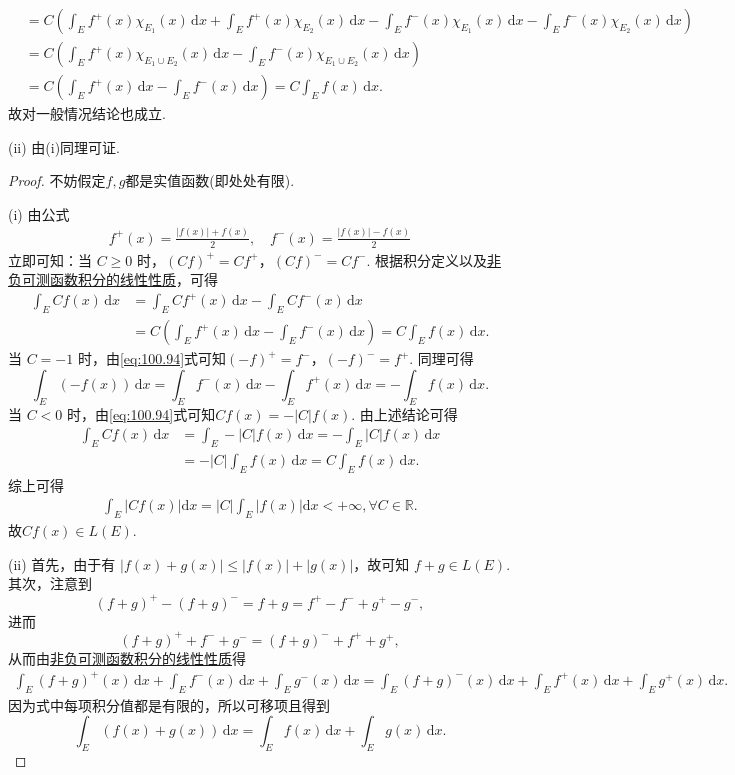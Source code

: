\documentclass[../../main.tex]{subfiles}
\begin{document}
\begin{remark}
\begin{align*}
&= C \left( \int_E f^+(x) \chi_{E_1}(x) \, \mathrm{d}x + \int_E f^+(x) \chi_{E_2}(x) \, \mathrm{d}x - \int_E f^-(x) \chi_{E_1}(x) \, \mathrm{d}x - \int_E f^-(x) \chi_{E_2}(x) \, \mathrm{d}x \right) \\
&= C \left( \int_E f^+(x) \chi_{E_1 \cup E_2}(x) \, \mathrm{d}x - \int_E f^-(x) \chi_{E_1 \cup E_2}(x) \, \mathrm{d}x \right) \\
&= C \left( \int_E f^+(x) \, \mathrm{d}x - \int_E f^-(x) \, \mathrm{d}x \right) = C \int_E f(x) \, \mathrm{d}x.
\end{align*}
故对一般情况结论也成立.

(ii) 由(i)同理可证.
\end{remark}
\begin{proof}
不妨假定$f,g$都是实值函数(即处处有限).

(i) 由公式
\begin{align}\label{eq:100.94}
f^+(x) = \frac{|f(x)| + f(x)}{2}, \quad f^-(x) = \frac{|f(x)| - f(x)}{2}
\end{align}
立即可知：当 \( C \geq 0 \) 时，\( (Cf)^+ = Cf^+ \)，\( (Cf)^- = Cf^- \). 根据积分定义以及\hyperref[theorem:非负可测函数积分的线性性质]{非负可测函数积分的线性性质}，可得
\begin{align*}
\int_E Cf(x) \, \mathrm{d}x &= \int_E Cf^+(x) \, \mathrm{d}x - \int_E Cf^-(x) \, \mathrm{d}x \\
&= C \left( \int_E f^+(x) \, \mathrm{d}x - \int_E f^-(x) \, \mathrm{d}x \right) = C \int_E f(x) \, \mathrm{d}x.
\end{align*}
当 \( C = -1 \) 时，由\eqref{eq:100.94}式可知\( (-f)^+ = f^- \)，\( (-f)^- = f^+ \). 同理可得
\[
\int_E (-f(x)) \, \mathrm{d}x = \int_E f^-(x) \, \mathrm{d}x - \int_E f^+(x) \, \mathrm{d}x = - \int_E f(x) \, \mathrm{d}x.
\]
当 \( C < 0 \) 时，由\eqref{eq:100.94}式可知\( Cf(x) = -|C|f(x) \). 由上述结论可得
\begin{align*}
\int_E Cf(x) \, \mathrm{d}x &= \int_E -|C| f(x) \, \mathrm{d}x = - \int_E |C|f(x) \, \mathrm{d}x \\
&= -|C| \int_E f(x) \, \mathrm{d}x = C \int_E f(x) \, \mathrm{d}x.
\end{align*}
综上可得
\begin{align*}
\int_E{\left| Cf\left( x \right) \right|\mathrm{d}x}=\left| C \right|\int_E{\left| f\left( x \right) \right|\mathrm{d}x}<+\infty ,\forall C\in \mathbb{R} .
\end{align*}
故\( Cf(x)\in L(E) \).

(ii) 首先，由于有 \( |f(x) + g(x)| \leq |f(x)| + |g(x)| \)，故可知 \( f + g \in L(E) \). 其次，注意到
\[
(f + g)^+ - (f + g)^- = f + g = f^+ - f^- + g^+ - g^-,
\]
进而
\[
(f + g)^+ + f^- + g^- = (f + g)^- + f^+ + g^+,
\]
从而由\hyperref[theorem:非负可测函数积分的线性性质]{非负可测函数积分的线性性质}得
\begin{align*}
\int_E (f + g)^+(x) \, \mathrm{d}x + \int_E f^-(x) \, \mathrm{d}x + \int_E g^-(x) \, \mathrm{d}x 
= \int_E (f + g)^-(x) \, \mathrm{d}x + \int_E f^+(x) \, \mathrm{d}x + \int_E g^+(x) \, \mathrm{d}x.
\end{align*}
因为式中每项积分值都是有限的，所以可移项且得到
\[
\int_E (f(x) + g(x)) \, \mathrm{d}x = \int_E f(x) \, \mathrm{d}x + \int_E g(x) \, \mathrm{d}x.
\]


\end{proof}
\end{document}
